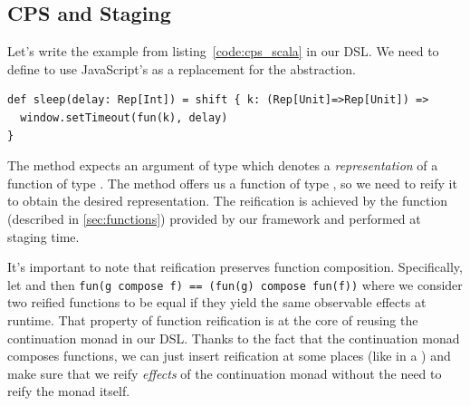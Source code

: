 \documentclass[runningheads,a4paper]{llncs}
\begin{document}
\subsection{CPS and Staging}
Let's write the example from listing~\ref{code:cps_scala} in our DSL. We need to define  to use JavaScript's  as a replacement for the  abstraction.
\begin{lstlisting}
def sleep(delay: Rep[Int]) = shift { k: (Rep[Unit]=>Rep[Unit]) =>
  window.setTimeout(fun(k), delay)
}
\end{lstlisting}

The  method expects an argument of type  which denotes a \emph{representation} of a function of type . The  method offers us a function of type , so we need to reify it to obtain the desired representation. The reification is achieved by the  function (described in \ref{sec:functions}) provided by our framework and performed at staging time.

It's important to note that reification preserves function composition. Specifically, let  and  then {\tt\small fun(g compose f) == (fun(g) compose fun(f))} where we consider two reified functions to be equal if they yield the same observable effects at runtime. That property of function reification is at the core of reusing the continuation monad in our DSL. Thanks to the fact that the continuation monad composes functions, we can just insert reification at some places (like in a ) and make sure that we reify \emph{effects} of the continuation monad without the need to reify the monad itself.
\end{document}
